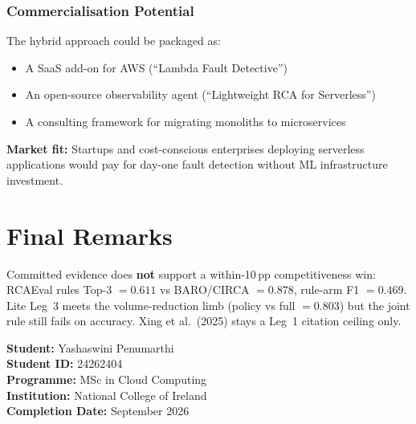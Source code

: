 \subsubsection{Commercialisation Potential}

The hybrid approach could be packaged as:
\begin{itemize}
    \item A SaaS add-on for AWS (``Lambda Fault Detective'')
    \item An open-source observability agent (``Lightweight RCA for Serverless'')
    \item A consulting framework for migrating monoliths to microservices
\end{itemize}

\textbf{Market fit:} Startups and cost-conscious enterprises deploying serverless applications would pay for day-one fault detection without ML infrastructure investment.

\section{Final Remarks}

Committed evidence does \textbf{not} support a within-10\,pp competitiveness win: RCAEval rules Top-3 $=0.611$ vs BARO/CIRCA $=0.878$, rule-arm F1 $=0.469$. Lite Leg~3 meets the volume-reduction limb (policy vs full $=0.803$) but the joint rule still fails on accuracy. Xing et al.\ (2025) stays a Leg~1 citation ceiling only.

\textbf{Student:} Yashaswini Penumarthi \\
\textbf{Student ID:} 24262404 \\
\textbf{Programme:} MSc in Cloud Computing \\
\textbf{Institution:} National College of Ireland \\
\textbf{Completion Date:} September 2026
